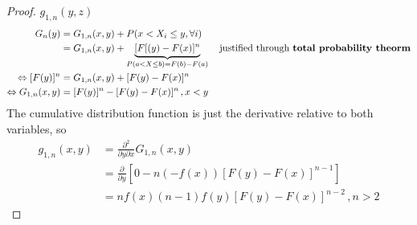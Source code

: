 \begin{proof}
    $g_{1,n}(y,z)$
    \begin{align*}
        G_n(y) & = G_{1,n}(x,y) + P(x<X_i\leq y, \forall i)\\
        & = G_{1,n}(x,y) + \underbrace{[F[(y) - F(x)]^n}_{P(a<X\leq b) = F(b)-F(a)}\quad \text{justified through \textbf{total probability theorm}}\\
        \Leftrightarrow [F(y)]^n & = G_{1,n}(x,y) + [F(y)-F(x)]^n\\
        \Leftrightarrow G_{1,n}(x,y) & = [F(y)]^n - [F(y)-F(x)]^n \, ,x<y
    \end{align*}
    The cumulative distribution function is just the derivative relative to both variables, so
    \begin{align*}
        g_{1,n}(x,y) & = \frac{\partial^2}{\partial y\partial x}G_{1,n}(x,y)\\
        & = \frac{\partial}{\partial y}[0-n(-f(x))[F(y)-F(x)]^{n-1}]\\
        & = nf(x)(n-1)f(y)[F(y)-F(x)]^{n-2}\, ,n>2
    \end{align*}
\end{proof}
